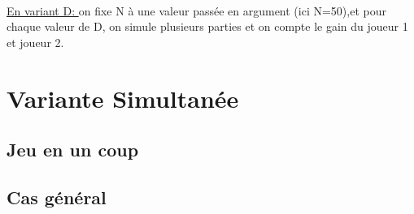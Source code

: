\documentclass{report}
\begin{document}
\begin{large}
    \qquad

    \\[1.5em]
    \underline{En variant D: } on fixe N à une valeur passée en argument (ici N=50),et pour 
    chaque valeur de D, on simule plusieurs parties et on compte le gain du joueur 1 et joueur 2.\\[1.5em]
  
  \end{large}
  

  {\let\clearpage\relax \chapter{Variante Simultanée}} 
  \section{Jeu en un coup}
  \section{Cas général}
  
\end{document}
